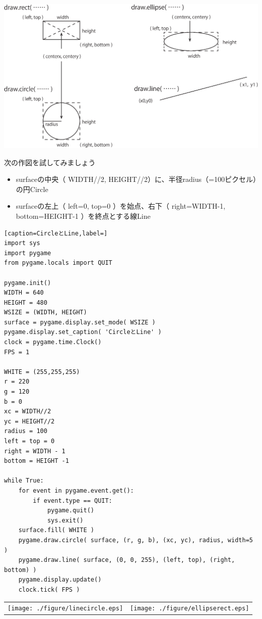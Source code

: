 \documentclass[uplatex,a4paper,11pt,oneside,openany]{jsbook}
\begin{document}
\begin{center}
\includegraphics[width=0.6\hsize]{./figure/pg03.eps}
\end{center}


次の作図を試してみましょう
\begin{itemize}
\item surfaceの中央（ WIDTH//2, HEIGHT//2）に、半径radius（=100ピクセル）の円Circle
\item surfaceの左上（ left=0, top=0 ）を始点、右下（ right=WIDTH-1, bottom=HEIGHT-1 ）を終点とする線Line
\end{itemize}

\begin{lstlisting}[caption=CircleとLine,label=]
import sys
import pygame
from pygame.locals import QUIT

pygame.init()
WIDTH = 640
HEIGHT = 480
WSIZE = (WIDTH, HEIGHT)
surface = pygame.display.set_mode( WSIZE )
pygame.display.set_caption( 'CircleとLine' )
clock = pygame.time.Clock()
FPS = 1

WHITE = (255,255,255)
r = 220
g = 120
b = 0
xc = WIDTH//2
yc = HEIGHT//2
radius = 100
left = top = 0
right = WIDTH - 1
bottom = HEIGHT -1

while True:
    for event in pygame.event.get():
        if event.type == QUIT:
            pygame.quit()
            sys.exit()
    surface.fill( WHITE )
    pygame.draw.circle( surface, (r, g, b), (xc, yc), radius, width=5 )
    pygame.draw.line( surface, (0, 0, 255), (left, top), (right, bottom) )
    pygame.display.update()
    clock.tick( FPS )
\end{lstlisting}

\begin{table}[H]
\vspace*{-0.5cm}
\begin{center}
    \begin{tabular}{cc}
    \texttt{[image: ./figure/linecircle.eps]} & \texttt{[image: ./figure/ellipserect.eps]}
  \end{tabular}
\end{center}
\end{table}
\end{document}
